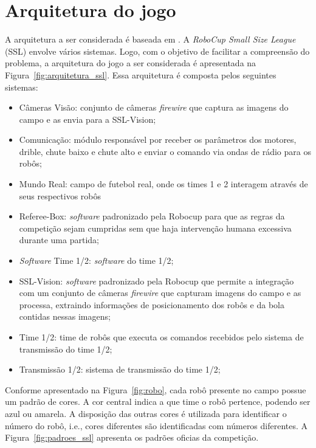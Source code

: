 \section{Arquitetura do jogo}\label{sec:arch_ssl}

A arquitetura a ser considerada é baseada em \cite{felixnavarro}.
A \textit{RoboCup Small Size League} (SSL) envolve vários sistemas.
Logo, com o objetivo de facilitar a compreensão do problema, a
arquitetura do jogo a ser considerada é apresentada na
Figura~\ref{fig:arquitetura_ssl}. Essa arquitetura é composta pelos
seguintes sistemas:

\begin{itemize}
  \item Câmeras Visão: conjunto de câmeras \textit{firewire} que captura as imagens do
        campo e as envia para a SSL-Vision;
  \item Comunicação: módulo responsável por receber os parâmetros
        dos motores, drible, chute baixo e chute alto e enviar o comando via
        ondas de rádio para os robôs;
  \item Mundo Real: campo de futebol real, onde os times 1 e 2 interagem
        através de seus respectivos robôs
  \item Referee-Box: \textit{software} padronizado pela Robocup para que as
        regras da competição sejam cumpridas sem que haja intervenção
        humana excessiva durante uma partida;
  \item \textit{Software} Time 1/2: \textit{software} do time 1/2;
  \item SSL-Vision: \textit{software} padronizado pela Robocup que permite a
        integração com um conjunto de câmeras \textit{firewire} que capturam
        imagens do campo e as processa, extraindo informações de posicionamento
        dos robôs e da bola contidas nessas imagens;
  \item Time 1/2: time de robôs que executa os comandos recebidos pelo
        sistema de transmissão do time 1/2;
  \item Transmissão 1/2: sistema de transmissão do time 1/2;
\end{itemize}

Conforme apresentado na Figura~\ref{fig:robo}, cada robô presente no campo possue
um padrão de cores. A cor central indica a que time o robô pertence, podendo ser
azul ou amarela. A disposição das outras cores é utilizada para identificar o número
do robô, i.e., cores diferentes são identificadas com números diferentes. A
Figura~\ref{fig:padroes_ssl} apresenta os padrões oficias da competição.

